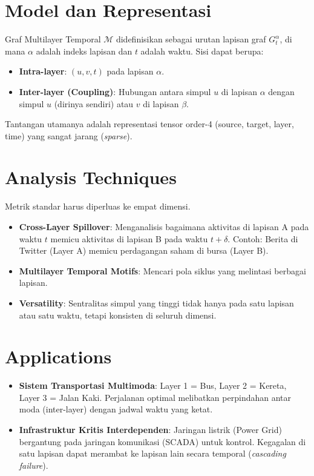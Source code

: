 \documentclass[12pt,a4paper]{book}
\begin{document}
\section{Model dan Representasi}
Graf Multilayer Temporal $\mathcal{M}$ didefinisikan sebagai urutan lapisan graf $G_t^{\alpha}$, di mana $\alpha$ adalah indeks lapisan dan $t$ adalah waktu.
Sisi dapat berupa:
\begin{itemize}
    \item \textbf{Intra-layer}: $(u, v, t)$ pada lapisan $\alpha$.
    \item \textbf{Inter-layer (Coupling)}: Hubungan antara simpul $u$ di lapisan $\alpha$ dengan simpul $u$ (dirinya sendiri) atau $v$ di lapisan $\beta$.
\end{itemize}
Tantangan utamanya adalah representasi tensor order-4 (source, target, layer, time) yang sangat jarang (\textit{sparse}).

\section{Analysis Techniques}
Metrik standar harus diperluas ke empat dimensi.
\begin{itemize}
    \item \textbf{Cross-Layer Spillover}: Menganalisis bagaimana aktivitas di lapisan A pada waktu $t$ memicu aktivitas di lapisan B pada waktu $t+\delta$. Contoh: Berita di Twitter (Layer A) memicu perdagangan saham di bursa (Layer B).
    \item \textbf{Multilayer Temporal Motifs}: Mencari pola siklus yang melintasi berbagai lapisan.
    \item \textbf{Versatility}: Sentralitas simpul yang tinggi tidak hanya pada satu lapisan atau satu waktu, tetapi konsisten di seluruh dimensi.
\end{itemize}

\section{Applications}
\begin{itemize}
    \item \textbf{Sistem Transportasi Multimoda}: Layer 1 = Bus, Layer 2 = Kereta, Layer 3 = Jalan Kaki. Perjalanan optimal melibatkan perpindahan antar moda (inter-layer) dengan jadwal waktu yang ketat.
    \item \textbf{Infrastruktur Kritis Interdependen}: Jaringan listrik (Power Grid) bergantung pada jaringan komunikasi (SCADA) untuk kontrol. Kegagalan di satu lapisan dapat merambat ke lapisan lain secara temporal (\textit{cascading failure}).
\end{itemize}
\end{document}
